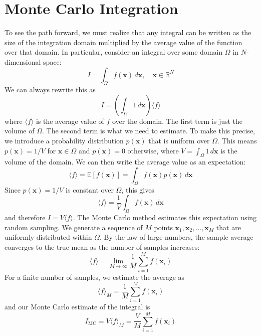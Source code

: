 \section{Monte Carlo Integration}

To see the path forward, we must realize that any integral can be written as the size of the integration domain multiplied by the average value of the function over that domain. In particular, consider an integral over some domain $\Omega$ in $N$-dimensional space:
\begin{equation}
    I = \int_{\Omega} f(\mathbf{x}) \, d\mathbf{x}, \quad \mathbf{x} \in \mathbb{R}^N
\end{equation}
We can always rewrite this as
\begin{equation}
    I = \left(\int_{\Omega} 1 \, d\mathbf{x}\right) \langle f \rangle
\end{equation}
where $\langle f \rangle$ is the average value of $f$ over the domain. The first term is just the volume of $\Omega$. The second term is what we need to estimate. To make this precise, we introduce a probability distribution $p(\mathbf{x})$ that is uniform over $\Omega$. This means $p(\mathbf{x}) = 1/V$ for $\mathbf{x} \in \Omega$ and $p(\mathbf{x}) = 0$ otherwise, where $V = \int_{\Omega} 1 \, d\mathbf{x}$ is the volume of the domain. We can then write the average value as an expectation:
\begin{equation}
    \langle f \rangle = \mathbb{E}[f(\mathbf{x})] = \int_{\Omega} f(\mathbf{x}) p(\mathbf{x}) \, d\mathbf{x}
\end{equation}
Since $p(\mathbf{x}) = 1/V$ is constant over $\Omega$, this gives
\begin{equation}
    \langle f \rangle = \frac{1}{V} \int_{\Omega} f(\mathbf{x}) \, d\mathbf{x}
\end{equation}
and therefore $I = V \langle f \rangle$. The Monte Carlo method estimates this expectation using random sampling. We generate a sequence of $M$ points $\mathbf{x}_1, \mathbf{x}_2, \ldots, \mathbf{x}_M$ that are uniformly distributed within $\Omega$. By the law of large numbers, the sample average converges to the true mean as the number of samples increases:
\begin{equation}
    \langle f \rangle = \lim_{M \to \infty} \frac{1}{M} \sum_{i=1}^{M} f(\mathbf{x}_i)
\end{equation}
For a finite number of samples, we estimate the average as
\begin{equation}
    \langle f \rangle_M = \frac{1}{M} \sum_{i=1}^{M} f(\mathbf{x}_i)
\end{equation}
and our Monte Carlo estimate of the integral is
\begin{equation}
    I_{\text{MC}} = V \langle f \rangle_M = \frac{V}{M} \sum_{i=1}^{M} f(\mathbf{x}_i)
\end{equation}


